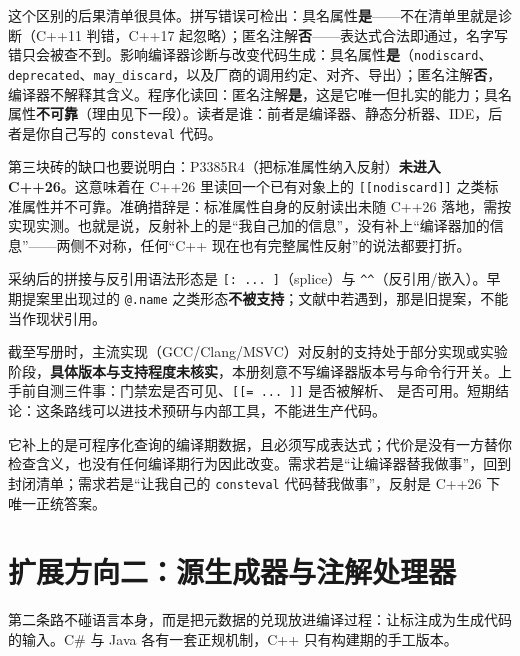 \documentclass[12pt,a4paper,fontset=fandol]{ctexbook}
\newcommand{\cpp}[1]{C++#1}
\newcommand{\seqkw}[1]{\seqsplit{\texttt{#1}}}
\begin{document}
这个区别的后果清单很具体。拼写错误可检出：具名属性\textbf{是}——不在清单里就是诊断（\cpp{11} 判错，\cpp{17} 起忽略）；匿名注解\textbf{否}——表达式合法即通过，名字写错只会被查不到。影响编译器诊断与改变代码生成：具名属性\textbf{是}（\texttt{nodiscard}、\texttt{deprecated}、\texttt{may\_discard}，以及厂商的调用约定、对齐、导出）；匿名注解\textbf{否}，编译器不解释其含义。程序化读回：匿名注解\textbf{是}，这是它唯一但扎实的能力；具名属性\textbf{不可靠}（理由见下一段）。读者是谁：前者是编译器、静态分析器、IDE，后者是你自己写的 \texttt{consteval} 代码。

第三块砖的缺口也要说明白：P3385R4（把标准属性纳入反射）\textbf{未进入 \cpp{26}}。这意味着在 \cpp{26} 里读回一个已有对象上的 \texttt{[[nodiscard]]} 之类标准属性并不可靠。准确措辞是：标准属性自身的反射读出未随 \cpp{26} 落地，需按实现实测。也就是说，反射补上的是“我自己加的信息”，没有补上“编译器加的信息”——两侧不对称，任何“\cpp{} 现在也有完整属性反射”的说法都要打折。

采纳后的拼接与反引用语法形态是 \texttt{[: ... ]}（splice）与 \texttt{\textasciicircum\textasciicircum}（反引用/嵌入）。早期提案里出现过的 \texttt{@.name} 之类形态\textbf{不被支持}；文献中若遇到，那是旧提案，不能当作现状引用。

\begin{note}[title={现状诚实交代：还不能进生产}]
截至写册时，主流实现（GCC/Clang/MSVC）对反射的支持处于部分实现或实验阶段，\textbf{具体版本与支持程度未核实}，本册刻意不写编译器版本号与命令行开关。上手前自测三件事：门禁宏是否可见、\texttt{[[= ... ]]} 是否被解析、\seqkw{std::meta::annotations\_of} 是否可用。短期结论：这条路线可以进技术预研与内部工具，不能进生产代码。
\end{note}

\begin{guideline}[title={反射路线的定位：把注解降级为可反射的编译期数据}]
它补上的是可程序化查询的编译期数据，且必须写成表达式；代价是没有一方替你检查含义，也没有任何编译期行为因此改变。需求若是“让编译器替我做事”，回到封闭清单；需求若是“让我自己的 \texttt{consteval} 代码替我做事”，反射是 \cpp{26} 下唯一正统答案。
\end{guideline}

\section{扩展方向二：源生成器与注解处理器}
\label{sec:three-ext-generators}

第二条路不碰语言本身，而是把元数据的兑现放进编译过程：让标注成为生成代码的输入。C\# 与 Java 各有一套正规机制，\cpp{} 只有构建期的手工版本。
\end{document}
